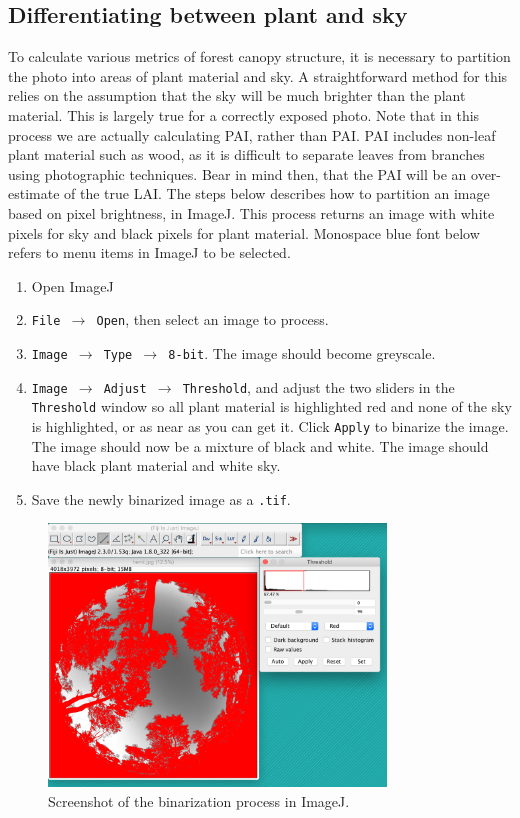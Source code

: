 \documentclass[11pt,a4paper]{article}
\newcommand\menu[1]{\texttt{\color{menu}#1}}  %
\newcommand\file[1]{\texttt{\color{file}#1}}  %
\begin{document}
\subsection{Differentiating between plant and sky}

To calculate various metrics of forest canopy structure, it is necessary to partition the photo into areas of plant material and sky. A straightforward method for this relies on the assumption that the sky will be much brighter than the plant material. This is largely true for a correctly exposed photo. Note that in this process we are actually calculating PAI, rather than PAI. PAI includes non-leaf plant material such as wood, as it is difficult to separate leaves from branches using photographic techniques. Bear in mind then, that the PAI will be an over-estimate of the true LAI. The steps below describes how to partition an image based on pixel brightness, in ImageJ. This process returns an image with white pixels for sky and black pixels for plant material. Monospace blue font below refers to menu items in ImageJ to be selected.

\begin{enumerate}
	\item{Open ImageJ}
	\item{\menu{File $\rightarrow$ Open}, then select an image to process.}
	\item{\menu{Image $\rightarrow$ Type $\rightarrow$ 8-bit}. The image should become greyscale.}
	\item{\menu{Image $\rightarrow$ Adjust $\rightarrow$ Threshold}, and adjust the two sliders in the \menu{Threshold} window so all plant material is highlighted red and none of the sky is highlighted, or as near as you can get it. Click \menu{Apply} to binarize the image. The image should now be a mixture of black and white. The image should have black plant material and white sky.}
	\item{Save the newly binarized image as a \file{.tif}.}
\end{enumerate}

\begin{figure}[H]
\centering
	\includegraphics[width=0.8\textwidth]{threshold}
	\caption{Screenshot of the binarization process in ImageJ.}
	\label{threshold}
\end{figure}
\end{document}
